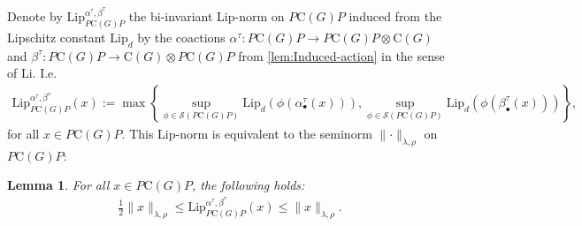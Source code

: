\documentclass{amsart}
\theoremstyle{plain}
\newtheorem{lemma}[theorem]{Lemma}
\theoremstyle{definition}
\theoremstyle{remark}
\begin{document}
	Denote by $\mathrm{Lip}^{\alpha^\tau,\beta^\tau}_{P\mathrm{C}(G)P}$ the bi-invariant Lip-norm on $P\mathrm{C}(G)P$ induced from the Lipschitz constant $\mathrm{Lip}_d$ by the coactions $\alpha^\tau : P\mathrm{C}(G)P \rightarrow P\mathrm{C}(G)P \otimes \mathrm{C}(G)$ and $\beta^\tau : P\mathrm{C}(G)P \rightarrow \mathrm{C}(G) \otimes P\mathrm{C}(G)P$ from \autoref{lem:Induced-action} in the sense of Li.
	I.e.
	\begin{align}
		\mathrm{Lip}^{\alpha^\tau,\beta^\tau}_{P\mathrm{C}(G)P}(x)
		:= \max\left\{\sup_{\phi \in \mathcal{S}(P\mathrm{C}(G)P)} \mathrm{Lip}_d (\phi(\alpha^\tau_\bullet(x))), \sup_{\phi \in \mathcal{S}(P\mathrm{C}(G)P)} \mathrm{Lip}_d(\phi(\beta^\tau_\bullet(x)))\right\},
	\end{align}
	for all $x \in P\mathrm{C}(G)P$.
	This Lip-norm is equivalent to the seminorm $\lVert \cdot \rVert_{\lambda,\rho}$ on $P\mathrm{C}(G)P$:
	
	\begin{lemma}\label{lem:Equivalence-induced-operator-seminorm}
		For all $x \in P\mathrm{C}(G)P$, the following holds:
		\begin{align}\label{eqn:equivalence-induced-and-left-seminorm}
			\frac{1}{2}\lVert x\rVert_{\lambda,\rho}
			\leq \mathrm{Lip}^{\alpha^\tau,\beta^\tau}_{P\mathrm{C}(G)P}(x)
			\leq \lVert x\rVert_{\lambda,\rho}.
		\end{align}
	\end{lemma}
	
\end{document}
